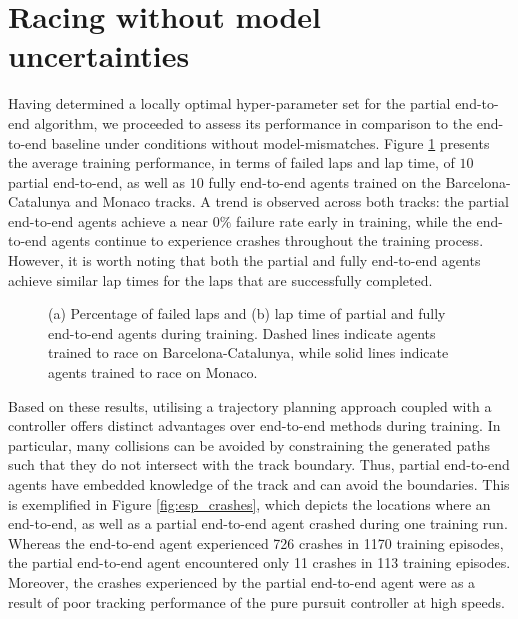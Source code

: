 \section{Racing without model uncertainties}

Having determined a locally optimal hyper-parameter set for the partial end-to-end algorithm, we proceeded to assess its performance in comparison to the end-to-end baseline under conditions without model-mismatches. 
Figure \ref{fig:all_tracks_train} presents the average training performance, in terms of failed laps and lap time, of $10$ partial end-to-end, as well as $10$ fully end-to-end agents trained on the Barcelona-Catalunya and Monaco tracks. 
A trend is observed across both tracks: the partial end-to-end agents achieve a near $0\%$ failure rate early in training, while the end-to-end agents continue to experience crashes throughout the training process.
However, it is worth noting that both the partial and fully end-to-end agents achieve similar lap times for the laps that are successfully completed. 

\begin{figure}[htb!]
    \centering
    
    \caption[Learning curves of partial and fully end-to-end agents trained to race on the Porto and Monaco tracks]{(a) Percentage of failed laps and (b) lap time of partial and fully end-to-end agents during training. Dashed lines indicate agents trained to race on Barcelona-Catalunya, while solid lines indicate agents trained to race on Monaco.}
    \label{fig:all_tracks_train}
\end{figure}

Based on these results, utilising a trajectory planning approach coupled with a controller offers distinct advantages over end-to-end methods during training.
In particular, many collisions can be avoided by constraining the generated paths such that they do not intersect with the track boundary. 
Thus, partial end-to-end agents have embedded knowledge of the track and can avoid the boundaries.
This is exemplified in Figure \ref{fig:esp_crashes}, which depicts the locations where an end-to-end, as well as a partial end-to-end agent crashed during one training run.
Whereas the end-to-end agent experienced 726 crashes in 1170 training episodes, the partial end-to-end agent encountered only 11 crashes in 113 training episodes.
Moreover, the crashes experienced by the partial end-to-end agent were as a result of poor tracking performance of the pure pursuit controller at high speeds.

